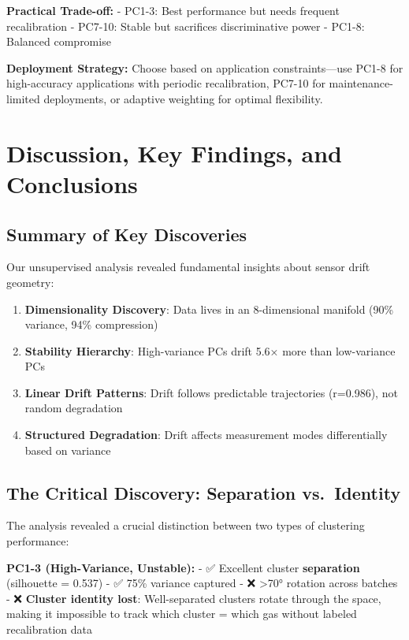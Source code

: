 \documentclass[
  letterpaper,
  DIV=11,
  numbers=noendperiod]{scrartcl}
\providecommand{\tightlist}{%
  \setlength{\itemsep}{0pt}\setlength{\parskip}{0pt}}
\begin{document}
\textbf{Practical Trade-off:} - PC1-3: Best performance but needs
frequent recalibration - PC7-10: Stable but sacrifices discriminative
power - PC1-8: Balanced compromise

\textbf{Deployment Strategy:} Choose based on application
constraints---use PC1-8 for high-accuracy applications with periodic
recalibration, PC7-10 for maintenance-limited deployments, or adaptive
weighting for optimal flexibility.

\section{Discussion, Key Findings, and
Conclusions}\label{discussion-key-findings-and-conclusions}

\subsection{Summary of Key
Discoveries}\label{summary-of-key-discoveries}

Our unsupervised analysis revealed fundamental insights about sensor
drift geometry:

\begin{enumerate}
\def\labelenumi{\arabic{enumi}.}
\tightlist
\item
  \textbf{Dimensionality Discovery}: Data lives in an 8-dimensional
  manifold (90\% variance, 94\% compression)
\item
  \textbf{Stability Hierarchy}: High-variance PCs drift 5.6× more than
  low-variance PCs
\item
  \textbf{Linear Drift Patterns}: Drift follows predictable trajectories
  (r=0.986), not random degradation
\item
  \textbf{Structured Degradation}: Drift affects measurement modes
  differentially based on variance
\end{enumerate}

\subsection{The Critical Discovery: Separation
vs.~Identity}\label{the-critical-discovery-separation-vs.-identity}

The analysis revealed a crucial distinction between two types of
clustering performance:

\textbf{PC1-3 (High-Variance, Unstable):} - ✅ Excellent cluster
\textbf{separation} (silhouette = 0.537) - ✅ 75\% variance captured -
❌ \textgreater70° rotation across batches - ❌ \textbf{Cluster identity
lost}: Well-separated clusters rotate through the space, making it
impossible to track which cluster = which gas without labeled
recalibration data
\end{document}
